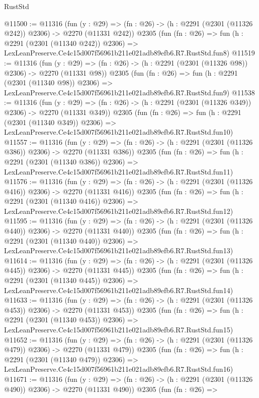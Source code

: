 \begin{lexlean}{RustStd}
\begin{coremodule}
@11500 := @11316
    (fun (y : @29) => (fn : @26) -> (h : @2291 (@2301 (@11326 @242)) @2306) -> @2270 (@11331 @242))
    @2305
    (fun (fn : @26) =>
    fun (h : @2291 (@2301 (@11340 @242)) @2306) =>
    LexLeanPreserve.Ce4c15d007f56961b211e021adb89efb6.R7.RustStd.fun8)
@11519 := @11316
    (fun (y : @29) => (fn : @26) -> (h : @2291 (@2301 (@11326 @98)) @2306) -> @2270 (@11331 @98))
    @2305
    (fun (fn : @26) =>
    fun (h : @2291 (@2301 (@11340 @98)) @2306) =>
    LexLeanPreserve.Ce4c15d007f56961b211e021adb89efb6.R7.RustStd.fun9)
@11538 := @11316
    (fun (y : @29) => (fn : @26) -> (h : @2291 (@2301 (@11326 @349)) @2306) -> @2270 (@11331 @349))
    @2305
    (fun (fn : @26) =>
    fun (h : @2291 (@2301 (@11340 @349)) @2306) =>
    LexLeanPreserve.Ce4c15d007f56961b211e021adb89efb6.R7.RustStd.fun10)
@11557 := @11316
    (fun (y : @29) => (fn : @26) -> (h : @2291 (@2301 (@11326 @386)) @2306) -> @2270 (@11331 @386))
    @2305
    (fun (fn : @26) =>
    fun (h : @2291 (@2301 (@11340 @386)) @2306) =>
    LexLeanPreserve.Ce4c15d007f56961b211e021adb89efb6.R7.RustStd.fun11)
@11576 := @11316
    (fun (y : @29) => (fn : @26) -> (h : @2291 (@2301 (@11326 @416)) @2306) -> @2270 (@11331 @416))
    @2305
    (fun (fn : @26) =>
    fun (h : @2291 (@2301 (@11340 @416)) @2306) =>
    LexLeanPreserve.Ce4c15d007f56961b211e021adb89efb6.R7.RustStd.fun12)
@11595 := @11316
    (fun (y : @29) => (fn : @26) -> (h : @2291 (@2301 (@11326 @440)) @2306) -> @2270 (@11331 @440))
    @2305
    (fun (fn : @26) =>
    fun (h : @2291 (@2301 (@11340 @440)) @2306) =>
    LexLeanPreserve.Ce4c15d007f56961b211e021adb89efb6.R7.RustStd.fun13)
@11614 := @11316
    (fun (y : @29) => (fn : @26) -> (h : @2291 (@2301 (@11326 @445)) @2306) -> @2270 (@11331 @445))
    @2305
    (fun (fn : @26) =>
    fun (h : @2291 (@2301 (@11340 @445)) @2306) =>
    LexLeanPreserve.Ce4c15d007f56961b211e021adb89efb6.R7.RustStd.fun14)
@11633 := @11316
    (fun (y : @29) => (fn : @26) -> (h : @2291 (@2301 (@11326 @453)) @2306) -> @2270 (@11331 @453))
    @2305
    (fun (fn : @26) =>
    fun (h : @2291 (@2301 (@11340 @453)) @2306) =>
    LexLeanPreserve.Ce4c15d007f56961b211e021adb89efb6.R7.RustStd.fun15)
@11652 := @11316
    (fun (y : @29) => (fn : @26) -> (h : @2291 (@2301 (@11326 @479)) @2306) -> @2270 (@11331 @479))
    @2305
    (fun (fn : @26) =>
    fun (h : @2291 (@2301 (@11340 @479)) @2306) =>
    LexLeanPreserve.Ce4c15d007f56961b211e021adb89efb6.R7.RustStd.fun16)
@11671 := @11316
    (fun (y : @29) => (fn : @26) -> (h : @2291 (@2301 (@11326 @490)) @2306) -> @2270 (@11331 @490))
    @2305
    (fun (fn : @26) =>

\end{coremodule}
\end{lexlean}
